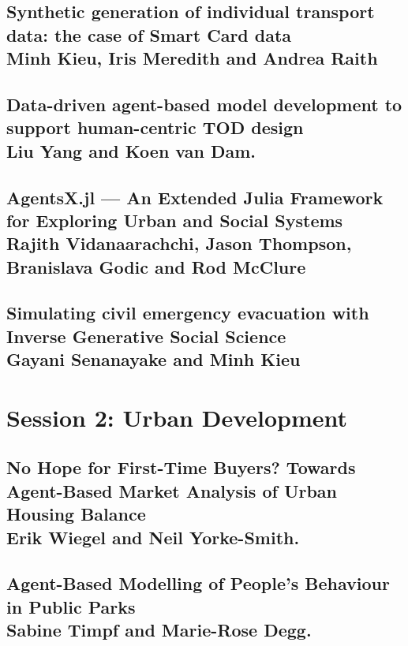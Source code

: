 \documentclass[a4paper,11pt]{article}
\begin{document}
\subsection{Synthetic generation of individual transport data: the case of Smart Card data
 \\ Minh Kieu, Iris Meredith and Andrea Raith}
 

\subsection{Data-driven agent-based model development to support human-centric TOD design \\ Liu Yang and Koen van Dam. }
 

\subsection{AgentsX.jl — An Extended Julia Framework for Exploring Urban and Social Systems \\ Rajith Vidanaarachchi, Jason Thompson, Branislava Godic and Rod McClure}
 

\subsection{Simulating civil emergency evacuation with Inverse Generative Social Science \\ Gayani Senanayake and Minh Kieu}
 


\section{Session 2: Urban Development}

\subsection{No Hope for First-Time Buyers? Towards Agent-Based Market Analysis of Urban Housing Balance \\ Erik Wiegel and Neil Yorke-Smith. }
 
 
 \subsection{Agent-Based Modelling of People's Behaviour in Public Parks \\ Sabine Timpf and Marie-Rose Degg. }
 
 
\end{document}
